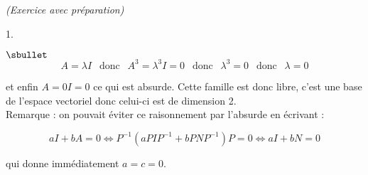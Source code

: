\documentclass[11pt]{article}%
\begin{document}
\begin{exercice}{\it (Exercice avec préparation)}
\begin{noliste}{1.}
\begin{noliste}{$\sbullet$}
\[
 A = \lambda I \ \ \text{ donc } \ \ A^{3} = \lambda^{3} I = 0 \ \
\text{ donc } \ \ \lambda^{3} = 0 \ \ \text{ donc } \ \ \lambda = 0 
\]

 et enfin $A = 0 I = 0$ ce qui est absurde. Cette famille est donc
libre, c'est une base de l'espace vectoriel donc celui-ci est de
dimension 2. \\

 Remarque : on pouvait éviter ce raisonnement par l'absurde en écrivant
: 
 
\[
 a I + b A = 0 \Longleftrightarrow P^{-1} ( a P I P^{-1} + b P N P^{-1}
) P = 0 \Longleftrightarrow a I + b N = 0 
\]

 qui donne immédiatement $a = c = 0$.

 \end{noliste}

 \end{noliste}
 \end{exercice}

 \newpage
\end{document}
